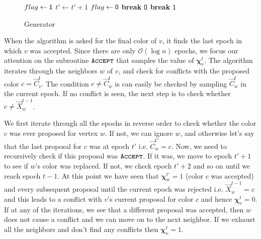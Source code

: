 \begin{wrapfigure}[21]{l}{0.51\textwidth}
\vspace{-1.5em}
\begin{framed}
    \renewcommand\figurename{Algorithm}
    \caption{Generator}
    \label{alg:coloring}
    \begin{algorithmic}[1]
                    \State {}
                \EndIf
                        \State $flag\gets \mathsf{1}$
                            \State $t'\gets t' + 1$
                                \State $flag\gets \mathsf{0}$
                                \State \textbf{break}
                            \EndIf
                        \EndWhile
                            \State \Return $\mathsf{0}$
                        \EndIf
                        \State \textbf{break}
                   \EndIf
                \EndFor
            \EndFor
            \State \Return $\mathsf{1}$
        \EndProcedure
    \end{algorithmic}
\end{framed}
\end{wrapfigure}

When the algorithm is asked for the final color of $v$, it finds the last epoch in which $v$ was accepted.
Since there are only $\mathcal O(\log n)$ epochs, we focus our attention on the subroutine $\texttt{\textsc{Accept}}$ that samples the value of $\bm\chi^t_v$.
The algorithm iterates through the neighbors $w$ of $v$, and check for conflicts with the proposed color $c=\vec C^t_v$.
The condition $c\not= \vec C^t_w$ is can easily be checked by sampling $\vec C^t_w$ in the current epoch.
If no conflict is seen, the next step is to check whether $c\not= \vec X^{t-1}_w$.

We first iterate through all the epochs in reverse order to check whether the color $c$ was ever proposed for vertex $w$.
If not, we can ignore $w$, and otherwise let's say that the last proposal for $c$ was at epoch $t'$ i.e. $\vec C^{t'}_w = c$.
Now, we need to recursively check if this proposal was $\texttt{\textsc{Accept}}$.
If it was, we move to epoch $t'+1$ to see if $w$'s color was replaced.
If not, we check epoch $t'+2$ and so on until we reach epoch $t-1$.
At this point we have seen that $\bm\chi^{t'}_w = 1$ (color $c$ was accepted) and every subsequent proposal until the current epoch was rejected
i.e. $\vec X^{t-1}_w = c$ and this leads to a conflict with $v$'s current proposal for color $c$ and hence $\bm\chi^t_v = 0$.
If at any of the iterations, we see that a different proposal was accepted, then $w$ does not cause a conflict and we can move on to the next neighbor.
If we exhaust all the neighbors and don't find any conflicts then $\bm\chi^t_v = 1$.

